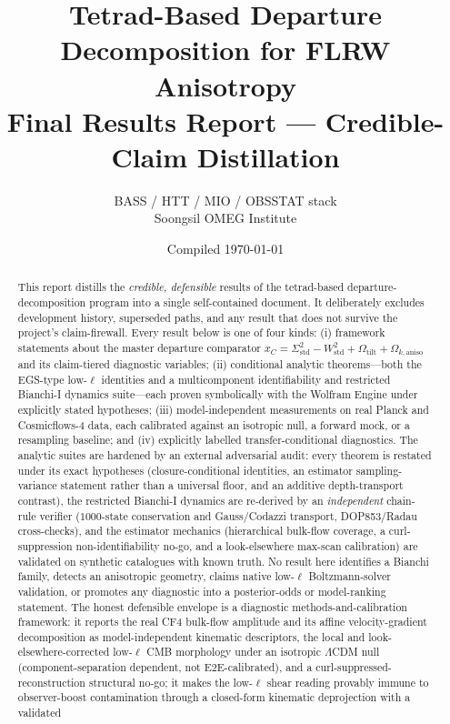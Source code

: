 \documentclass[11pt,a4paper]{article}
\title{\textbf{Tetrad-Based Departure Decomposition for FLRW Anisotropy}\\[4pt]
\large Final Results Report --- Credible-Claim Distillation}
\author{BASS / HTT / MIO / OBSSTAT stack\\\small Soongsil OMEG Institute}
\date{Compiled \today}
\newcommand{\xC}{x_{C}}
\newcommand{\Sigstd}{\Sigma^{2}_{\mathrm{std}}}
\newcommand{\Wstd}{W^{2}_{\mathrm{std}}}
\newcommand{\Otilt}{\Omega_{\mathrm{tilt}}}
\newcommand{\Okaniso}{\Omega_{k,\mathrm{aniso}}}
\theoremstyle{plain}
\theoremstyle{definition}
\begin{document}
\maketitle

\begin{abstract}
\noindent
This report distills the \emph{credible, defensible} results of the
tetrad-based departure-decomposition program into a single
self-contained document. It deliberately excludes development
history, superseded paths, and any result that does not survive the
project's claim-firewall. Every result below is one of four kinds:
(i) framework statements about the master departure comparator
$\xC=\Sigstd-\Wstd+\Otilt+\Okaniso$ and its claim-tiered diagnostic
variables; (ii) conditional analytic theorems---both the EGS-type
low-$\ell$ identities and a multicomponent identifiability and
restricted Bianchi-I dynamics suite---each proven symbolically with
the Wolfram Engine under explicitly stated hypotheses; (iii)
model-independent measurements on real Planck and Cosmicflows-4 data,
each calibrated against an isotropic null, a forward mock, or a
resampling baseline; and (iv) explicitly labelled
transfer-conditional diagnostics. The analytic suites are hardened by
an external adversarial audit: every theorem is restated under its
exact hypotheses (closure-conditional identities, an estimator
sampling-variance statement rather than a universal floor, and an
additive depth-transport contrast), the restricted Bianchi-I dynamics
are re-derived by an \emph{independent} chain-rule verifier
($1000$-state conservation and Gauss/Codazzi transport, DOP853/Radau
cross-checks), and the estimator mechanics (hierarchical bulk-flow
coverage, a curl-suppression non-identifiability no-go, and a
look-elsewhere max-scan calibration) are validated on synthetic
catalogues with known truth. No result here identifies a Bianchi
family, detects an anisotropic geometry, claims native low-$\ell$
Boltzmann-solver validation, or promotes any diagnostic into a
posterior-odds or model-ranking statement. The honest defensible
envelope is a diagnostic methods-and-calibration framework: it reports
the real CF4 bulk-flow amplitude and its affine velocity-gradient
decomposition as model-independent kinematic descriptors, the local and
look-elsewhere-corrected low-$\ell$ CMB morphology under an isotropic
$\Lambda$CDM null (component-separation dependent, not E2E-calibrated),
and a curl-suppressed-reconstruction structural no-go; it makes the
low-$\ell$ shear reading provably immune to observer-boost contamination
through a closed-form kinematic deprojection with a validated

\end{abstract}
\end{document}
